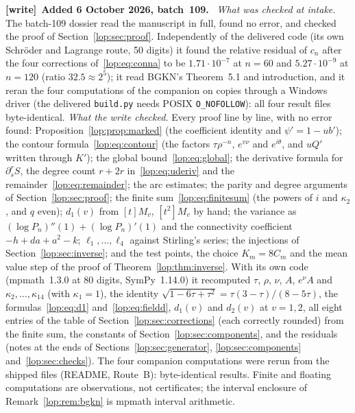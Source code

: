 \documentclass[11pt,letterpaper]{article}
\numberwithin{equation}{section}
\theoremstyle{remark}\newtheorem{remark}[theorem]{Remark}
\newcommand{\file}[1]{\nolinkurl{#1}}
\newenvironment{writenote}[1][]{\par\smallskip\begingroup\small
 \noindent\textbf{[write]}\if\relax\detokenize{#1}\relax\else~\textbf{#1.}\fi\ }%
 {\par\endgroup\smallskip}
\begin{document}
\begin{writenote}[Added 6 October 2026, batch~109]
\emph{What was checked at intake.} The batch-109 dossier read the
manuscript in full, found no error, and checked the proof of
Section~\ref{lop:sec:proof}. Independently of the delivered code (its own
Schr\"oder and Lagrange route, 50 digits) it found the relative residual of
$c_n$ after the four corrections of~\eqref{lop:eq:conna} to be
$1.71\cdot10^{-7}$ at $n=60$ and $5.27\cdot10^{-9}$ at $n=120$ (ratio
$32.5\approx2^5$); it read BGKN's Theorem~5.1 and introduction, and it reran
the four computations of the companion on copies through a Windows driver
(the delivered \file{build.py} needs POSIX \texttt{O\_NOFOLLOW}): all four
result files byte-identical. \emph{What the write checked.} Every proof line
by line, with no error found: Proposition~\ref{lop:prop:marked} (the
coefficient identity and $\psi'=1-ub'$); the contour
formula~\eqref{lop:eq:contour} (the factors $\tau\rho^{-n}$, $e^{v\nu}$ and
$e^{i\theta}$, and $uQ'$ written through $K'$); the global
bound~\eqref{lop:eq:global}; the derivative formula for $\partial_s^rS$, the
degree count $r+2r$ in~\eqref{lop:eq:uderiv} and the
remainder~\eqref{lop:eq:remainder}; the arc estimates; the parity and degree
arguments of Section~\ref{lop:sec:proof}; the finite
sum~\eqref{lop:eq:finitesum} (the powers of $i$ and $\kappa_2$, and $q$
even); $d_1(v)$ from $[t]M_v$, $[t^2]M_v$ by hand; the variance as
$(\log P_n)''(1)+(\log P_n)'(1)$ and the connectivity coefficient
$-h+da+a^2-k$; $\ell_1,\dots,\ell_4$ against Stirling's series; the
injections of Section~\ref{lop:sec:inverse}; and the test points, the
choice $K_m=8C_m$ and the mean value step of the proof of
Theorem~\ref{lop:thm:inverse}. With its own code (mpmath~1.3.0 at 80 digits,
SymPy~1.14.0) it recomputed $\tau$, $\rho$, $\nu$, $A$, $e^\nu A$ and
$\kappa_2,\dots,\kappa_{14}$ (with $\kappa_1=1$), the identity
$\sqrt{1-6\tau+\tau^2}=\tau(3-\tau)/(8-5\tau)$, the
formulas~\eqref{lop:eq:d1} and~\eqref{lop:eq:fieldd}, $d_1(v)$ and $d_2(v)$
at $v=1,2$, all eight entries of the table of
Section~\ref{lop:sec:corrections} (each correctly rounded) from the finite
sum, the constants of Section~\ref{lop:sec:components}, and the residuals
(notes at the ends of Sections~\ref{lop:sec:generator},
\ref{lop:sec:components} and~\ref{lop:sec:checks}). The four companion
computations were rerun from the shipped files (README, Route~B):
byte-identical results. Finite and floating computations are observations,
not certificates; the interval enclosure of Remark~\ref{lop:rem:bgkn} is
mpmath interval arithmetic.


\end{writenote}
\end{document}
